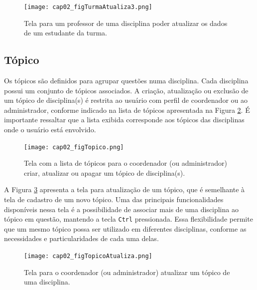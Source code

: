 \begin{figure}[!ht]
  \centering
  \texttt{[image: cap02\_figTurmaAtualiza3.png]}
  \caption{Tela para um professor de uma disciplina poder atualizar os dados de um estudante da turma.}
  \label{fig:cap02_figTurmaAtualiza3}
\end{figure}






\subsection{Tópico}\label{sec:topicos}

Os tópicos são definidos para agrupar questões numa disciplina. Cada disciplina possui um conjunto de tópicos associados. A criação, atualização ou exclusão de um tópico de disciplina(s) é restrita ao usuário com perfil de coordenador ou ao administrador, conforme indicado na lista de tópicos apresentada na Figura \ref{fig:cap02_figTopico}. É importante ressaltar que a lista exibida corresponde aos tópicos das disciplinas onde o usuário está envolvido.


\begin{figure}[!ht]
  \centering
  \texttt{[image: cap02\_figTopico.png]}
  \caption{Tela com a lista de tópicos para o coordenador (ou administrador) criar, atualizar ou apagar um tópico de disciplina(s).}
  \label{fig:cap02_figTopico}
\end{figure}

A Figura \ref{fig:cap02_figTopicoAtualiza} apresenta a tela para atualização de um tópico, que é semelhante à tela de cadastro de um novo tópico. Uma das principais funcionalidades disponíveis nessa tela é a possibilidade de associar mais de uma disciplina ao tópico em questão, mantendo a tecla \texttt{Ctrl} pressionada. Essa flexibilidade permite que um mesmo tópico possa ser utilizado em diferentes disciplinas, conforme as necessidades e particularidades de cada uma delas.

\begin{figure}[!ht]
  \centering
  \texttt{[image: cap02\_figTopicoAtualiza.png]}
  \caption{Tela para o coordenador (ou administrador) atualizar um tópico de uma disciplina.}
  \label{fig:cap02_figTopicoAtualiza}
\end{figure}

